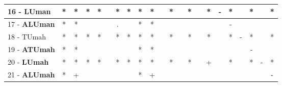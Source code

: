 \begin{table}[h]
\begin{center}
\begin{tabular}{lcc|cc|cc|cc|cc|cc|cc|cc|cc|cc|c}
16 - \textbf{LUman}	& * & * & * & * &   & * & * & * & * &   & * &   & * &   & * & - & * &   & * &   & * \\ \hline
17 - \textbf{ALUman}	& * & * &   &   &   & . &   & * & * &   &   &   &   &   &   &   & - &   &   &   &   \\
18 - TUmah	& * & * & * & * &   & * & * & * & * &   & * &   & * &   & * &   & * & - & * &   & * \\ \hline
19 - \textbf{ATUmah}	& * & * &   &   &   &   &   & * & * &   &   &   &   &   &   &   &   &   & - &   &   \\
20 - \textbf{LUmah}	& * & * & * & * &   & * & * & * & * &   & * &   & * &   & + &   & * &   & * & - & * \\ \hline
21 - \textbf{ALUmah}	& * & + &   &   &   &   &   & * & + &   &   &   &   &   &   &   &   &   &   &   & - \\\end{tabular}
\label{stratsALCKappaFriedCIELM}
\end{center}
\end{table}